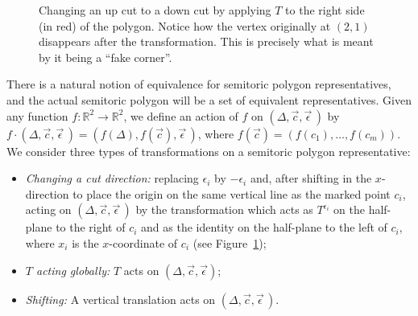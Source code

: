 \documentclass[pdftex]{sigma}
\numberwithin{equation}{section}
\def\R{{\mathbb R}}
\newcommand{\De}{\Delta}
\newcommand{\strep}{(\De,\vec{c},\vec{\epsilon}\,)}
\begin{document}
 \begin{figure}
 \centering
 \caption{Changing an up cut to a down cut by applying $T$ to the right side (in red) of the polygon. Notice how the vertex originally at $(2,1)$ disappears after the transformation. This is precisely what is meant by it being a ``fake corner''.} \label{fig:change-cut}
 \end{figure}


There is a natural notion of equivalence for semitoric polygon representatives, and the actual semitoric polygon will be a set of equivalent representatives.
Given any function $f\colon \R^2\to \R^2$, we define an action of $f$ on $\strep$ by $f\cdot \strep = (f(\Delta),f(\vec{c}), \vec{\epsilon}\,)$,
where $f(\vec{c}) = (f(c_1), \ldots, f(c_m))$.
We consider three types of transformations on a semitoric polygon representative:
\begin{itemize}\itemsep=0pt
 \item \emph{Changing a cut direction:} replacing $\epsilon_i$ by $-\epsilon_i$ and, after shifting in the $x$-direction to place the origin on the same vertical line as the marked point $c_i$, acting on $\strep$ by the transformation which acts as $T^{\epsilon_i}$ on the half-plane to the right of $c_i$
 and as the identity on the half-plane to the left of $c_i$, where $x_i$ is the $x$-coordinate of $c_i$ (see Figure~\ref{fig:change-cut});
 \item \emph{$T$ acting globally:} $T$ acts on $(\Delta, \vec c, \vec\epsilon)$;
 \item \emph{Shifting:} A vertical translation acts on $\strep$.
\end{itemize}
\end{document}
